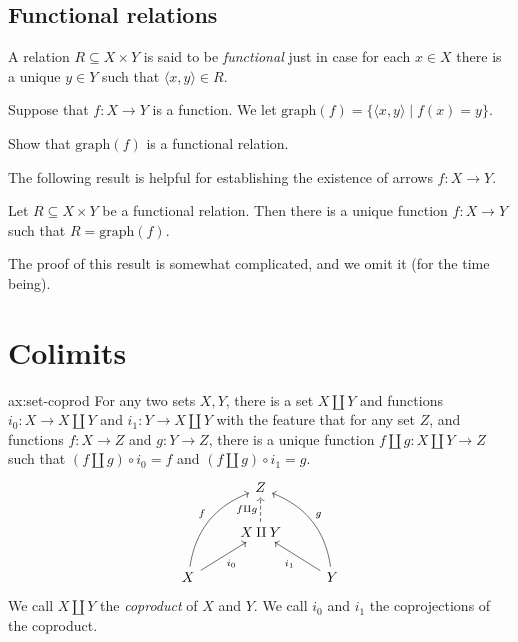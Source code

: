 \subsection*{Functional relations}

\begin{defn} A relation $R\subseteq X\times Y$ is said to be
  \emph{functional} just in case for each $x\in X$ there is a unique
  $y\in Y$ such that $\langle x,y\rangle \in R$. \end{defn}

\begin{defn} Suppose that $f:X\to Y$ is a function.  We let
  $\mathrm{graph}(f)= \{ \langle x,y\rangle \mid f(x)=y
  \}$. \end{defn}

\begin{exercise} Show that $\mathrm{graph}(f)$ is a functional
  relation. \end{exercise}

The following result is helpful for establishing the existence of
arrows $f:X\to Y$.

\begin{prop} Let $R\subseteq X\times Y$ be a functional relation.
  Then there is a unique function $f:X\to Y$ such that
  $R=\mathrm{graph}(f)$. \end{prop}

The proof of this result is somewhat complicated, and we omit it (for
the time being).



\section{Colimits}


\newcommand{\cpr}{\amalg}

\begin{axi}[Coproducts]{ax:set-coprod} For any two sets $X,Y$, there
  is a set $X\amalg Y$ and functions $i_0:X\to X\amalg Y$ and
  $i_1:Y\to X\amalg Y$ with the feature that for any set $Z$, and
  functions $f:X\to Z$ and $g:Y\to Z$, there is a unique function
  $f\cpr g:X\cpr Y\to Z$ such that $(f\cpr g)\circ i_0=f$ and
  $(f\cpr g)\circ i_1=g$.
  \[ \begin{tikzcd}
    & Z  \\
    & X \cpr Y \arrow[dashed,u,"f\cpr g"] \\
    X \arrow[bend left,uur,"f"] \arrow[ur,"i_0"'] & & Y \arrow[bend
    right,uul,"g"'] \arrow[ul,"i_1"] \end{tikzcd} \] We call $X\cpr Y$
  the \emph{coproduct} of $X$ and $Y$.  We call $i_0$ and $i_1$ the
  coprojections of the coproduct.
   \end{axi}

